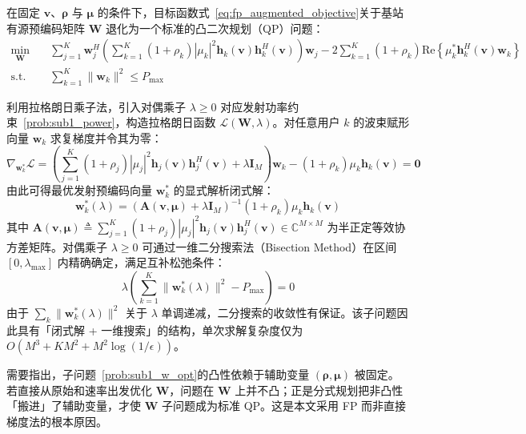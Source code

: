 在固定 $\bm{v}$、$\bm{\rho}$ 与 $\bm{\mu}$ 的条件下，目标函数式~\eqref{eq:fp_augmented_objective}关于基站有源预编码矩阵 $\bm{W}$ 退化为一个标准的凸二次规划（QP）问题：
\begin{subequations}
  \label{prob:sub1_w_opt}
  \begin{align}
    \min_{\bm{W}} \quad & \sum_{j=1}^K \bm{w}_j^H \left( \sum_{k=1}^K (1+\rho_k)|\mu_k|^2 \bm{h}_k(\bm{v})\bm{h}_k^H(\bm{v}) \right) \bm{w}_j - 2\sum_{k=1}^K (1+\rho_k)\mathrm{Re}\left\{ \mu_k^* \bm{h}_k^H(\bm{v})\bm{w}_k \right\} \label{prob:sub1_obj} \\
    \text{s.t.} \quad & \sum_{k=1}^K \|\bm{w}_k\|^2 \le P_{\max} \label{prob:sub1_power}
  \end{align}
\end{subequations}

利用拉格朗日乘子法，引入对偶乘子 $\lambda \ge 0$ 对应发射功率约束~\eqref{prob:sub1_power}，构造拉格朗日函数 $\mathcal{L}(\bm{W}, \lambda)$。对任意用户 $k$ 的波束赋形向量 $\bm{w}_k$ 求复梯度并令其为零：
\begin{equation}
  \nabla_{\bm{w}_k^*} \mathcal{L} = \left( \sum_{j=1}^K (1+\rho_j)|\mu_j|^2 \bm{h}_j(\bm{v})\bm{h}_j^H(\bm{v}) + \lambda \bm{I}_M \right) \bm{w}_k - (1+\rho_k)\mu_k \bm{h}_k(\bm{v}) = \bm{0}
  \label{eq:w_k_derivative}
\end{equation}
由此可得最优发射预编码向量 $\bm{w}_k^*$ 的显式解析闭式解：
\begin{equation}
  \bm{w}_k^*(\lambda) = \left( \bm{A}(\bm{v}, \bm{\mu}) + \lambda \bm{I}_M \right)^{-1} (1+\rho_k)\mu_k \bm{h}_k(\bm{v})
  \label{eq:optimal_wk_closed_form}
\end{equation}
其中 $\bm{A}(\bm{v}, \bm{\mu}) \triangleq \sum_{j=1}^K (1+\rho_j)|\mu_j|^2 \bm{h}_j(\bm{v})\bm{h}_j^H(\bm{v}) \in \mathbb{C}^{M \times M}$ 为半正定等效协方差矩阵。对偶乘子 $\lambda \ge 0$ 可通过一维二分搜索法（Bisection Method）在区间 $[0, \lambda_{\max}]$ 内精确确定，满足互补松弛条件：
\begin{equation}
  \lambda \left( \sum_{k=1}^K \|\bm{w}_k^*(\lambda)\|^2 - P_{\max} \right) = 0
  \label{eq:slackness_condition}
\end{equation}
由于 $\sum_k\|\bm{w}_k^*(\lambda)\|^2$ 关于 $\lambda$ 单调递减，二分搜索的收敛性有保证。该子问题因此具有「闭式解 + 一维搜索」的结构，单次求解复杂度仅为 $O(M^3 + KM^2 + M^2\log(1/\epsilon))$。

需要指出，子问题~\eqref{prob:sub1_w_opt}的凸性依赖于辅助变量 $(\bm{\rho},\bm{\mu})$ 被固定。若直接从原始和速率出发优化 $\bm{W}$，问题在 $\bm{W}$ 上并不凸；正是分式规划把非凸性「搬进」了辅助变量，才使 $\bm{W}$ 子问题成为标准 QP。这是本文采用 FP 而非直接梯度法的根本原因。

